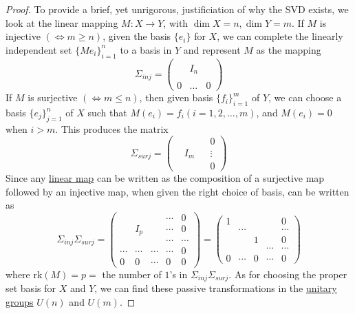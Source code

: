 	\begin{proof}
		To provide a brief, yet unrigorous, justificiation of why the SVD exists, we look at the linear mapping $M: X \to Y$, with $\dim{X} = n, \dim{Y} = m$. If $M$ is injective $(\iff m \geq n)$, given the basis $\{e_i\}$ for $X$, we can complete the linearly independent set $\{Me_i\}_{i=1}^n$ to a basis in $Y$ and represent $M$ as the mapping
		\begin{equation}
			\Sigma_{inj} = \begin{pmatrix} &&\\ &I_n&\\ &&\\ 0&\ldots &0 \end{pmatrix}
		\end{equation}
		If $M$ is surjective $(\iff m \leq n)$, then given basis $\{f_i\}_{i=1}^m$ of $Y$, we can choose a basis $\{e_j\}_{j=1}^n$ of $X$ such that $M(e_i) = f_i (i = 1, 2, \ldots, m)$, and $M(e_i) = 0$ when $i > m$. This produces the matrix
		\begin{equation}
			\Sigma_{surj} = \begin{pmatrix} &&&0\\&I_m&& \vdots \\&&&0\end{pmatrix}
		\end{equation} 
		Since any \hyperref[def:linear_map]{linear map} can be written as the composition of a surjective map followed by an injective map, when given the right choice of basis, can be written as 
		\begin{equation}
			\Sigma_{inj} \Sigma_{surj} = \begin{pmatrix}
			&&&\cdots&0\\
			&I_p&&\cdots&0\\
			&&&\cdots&\cdots\\
			\cdots&\cdots&\cdots&\cdots&0\\
			0&0&\cdots&0&0
			\end{pmatrix} = \begin{pmatrix}
			1&&&&0\\
			&\cdots&&&\cdots\\
			&&1&&0\\
			&&&\cdots&\cdots\\
			0&\cdots&0&\cdots&0
			\end{pmatrix}
		\end{equation}
		where rk$(M) = p = $ the number of $1$'s in $\Sigma_{inj} \Sigma_{surj}$. As for choosing the proper set basis for $X$ and $Y$, we can find these passive transformations in the \hyperref[def:unitary-group]{unitary groups} $U(n)$ and $U(m)$. 
	\end{proof}

